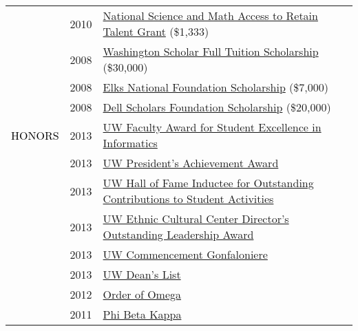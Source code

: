 \documentclass[12pt]{article}
\begin{document}
{{\begin{longtable}{Rp{1.0in}p{0.25in}p{4.75in}}
& \footnotesize{2010} & \href{http://www2.ed.gov/programs/smart/index.html}{{National Science and Math Access to Retain Talent Grant}} (\$1,333) \\

& \footnotesize{2008} & \href{http://www.wsac.wa.gov/}{{Washington Scholar Full Tuition Scholarship}} (\$30,000) \\

& \footnotesize{2008} & \href{http://www.elks.org/enf/scholars/}{{Elks National Foundation Scholarship}} (\$7,000) \\

& \footnotesize{2008} & \href{https://www.dellscholars.org/}{{Dell Scholars Foundation Scholarship}} (\$20,000) \\

\textcolor{black}{\footnotesize{\uppercase{Honors}}} & \footnotesize{2013} & \href{https://ischool.uw.edu/feature-stories/2013-ischool-convocation-celebrates-achievement-and-community}{{UW Faculty Award for Student Excellence in Informatics}} \\

& \footnotesize{2013} & \href{http://www.washington.edu/omad/celebration/recognition-scholarship-recipients/2013-celebration-scholarship-recipients/}{{UW President’s Achievement Award}} \\

& \footnotesize{2013} & \href{http://depts.washington.edu/thehub/hub-events/hub-awards/}{{UW Hall of Fame Inductee for Outstanding Contributions to Student Activities}} \\

& \footnotesize{2013} & \href{https://www.facebook.com/EthnicCulturalCenter/photos/a.10151638127531422.1073741830.124987626421/10151638128881422/}{{UW Ethnic Cultural Center Director’s Outstanding Leadership Award}} \\

& \footnotesize{2013} & \href{https://www.facebook.com/UWiSchool/posts/10151645734368695}{{UW Commencement Gonfaloniere}} \\

& \footnotesize{2013} & \href{https://www.yakimaherald.com/news/education/school-news-sept/article_af5885a3-bcbc-5925-bb87-a84844c6d36a.html}{{UW Dean’s List}} \\

& \footnotesize{2012} & \href{http://orderofomega.org/}{{Order of Omega}} \\

& \footnotesize{2011} & \href{https://www.pbk.org/}{{Phi Beta Kappa}} \\


\end{longtable}}}
\end{document}
